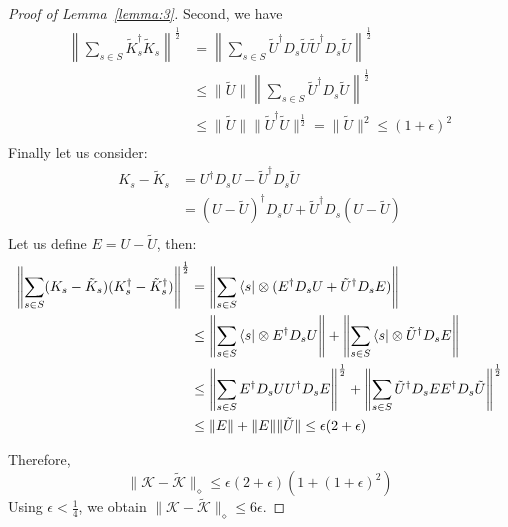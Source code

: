 \documentclass[aps,floatfix,10pt,amssymb,amsfont,amsmath,superscriptaddress,float,nofootinbib,longbibliography,nobalancelastpage,twocolumn]{revtex4-2}
\begin{document}
\begin{proof}[Proof of Lemma~\ref{lemma:3}]
Second, we have
\begin{align}
    \left\|\sum_{s\in S}\tilde K_s^{\dagger} \tilde K_s \right\|^{\frac{1}{2}} &= \left\|\sum_{s\in S} \tilde U^{\dagger} D_s \tilde U\tilde U^{\dagger}  D_s \tilde U\right\|^{\frac{1}{2}} \\
     &\leq \|\tilde U\|\left\|\sum_{s\in S} \tilde U^{\dagger} D_s  \tilde U\right\|^{\frac{1}{2}}\\
     &\leq \|\tilde U\| \|\tilde U^{\dagger}  \tilde U\|^{\frac{1}{2}}= \|\tilde U\|^2 \leq (1+\epsilon)^2\\
\end{align}
Finally let us consider:
\begin{align}
    K_s-\tilde K_s &= U^{\dagger}  D_s U-\tilde U^{\dagger}  D_s \tilde U\\
    &=  (U-\tilde U)^{\dagger}  D_s U+\tilde U^{\dagger}  D_s (U-\tilde U)\\
\end{align}
Let us define $E = U - \tilde U$, then:
\begin{align}
    \left\|\sum_{s\in S}(K_s - \tilde K_s)(K_s^\dagger - \tilde K_s^\dagger)\right\|^{\frac{1}{2}}&= \left\| \sum_{s \in S}\bra{s} \otimes ( E^{\dagger}  D_s U+\tilde U^{\dagger}  D_sE)\right\|\\
    &\leq  \left\| \sum_{s \in S} \bra{s} \otimes E^{\dagger}  D_s U \right\| + \left\| \sum_{s \in S} \bra{s} \otimes \tilde U^{\dagger}  D_sE\right\|\\
    &\leq  \left\| \sum_{s \in S} E^{\dagger}  D_s U U^{\dagger} D_s E \right\|^{\frac{1}{2}} + \left\| \sum_{s \in S} \tilde U^{\dagger}  D_sEE^{\dagger} D_s \tilde U\right\|^{\frac{1}{2}}\\
    &\leq \|E\| + \|E\|\|\tilde U\| \leq \epsilon(2+\epsilon)
\end{align}

Therefore,
\begin{equation}
    \|\mathcal{K} - \tilde{\mathcal{K}}\|_{\diamond} \leq \epsilon(2+\epsilon)(1+(1+\epsilon)^2)
\end{equation}
Using $\epsilon<\frac14$, we obtain $\|\mathcal{K} - \tilde {\mathcal{K}}\|_{\diamond} \leq 6\epsilon$.
\end{proof}
\end{document}
